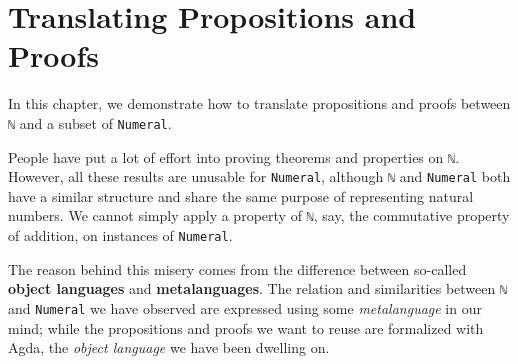 \documentclass[\main/thesis.tex]{subfiles}
\begin{document}
\chapter{Translating Propositions and Proofs}\label{translation}

In this chapter, we demonstrate how to translate propositions and proofs between
\lstinline|ℕ| and a subset of \lstinline|Numeral|.

People have put a lot of effort into proving theorems and properties on
\lstinline|ℕ|.
However, all these results are unusable for \lstinline|Numeral|,
although \lstinline|ℕ| and \lstinline|Numeral| both have a similar structure and
share the same purpose of representing natural numbers.
We cannot simply apply a property of \lstinline|ℕ|, say,
the commutative property of addition, on instances of \lstinline|Numeral|.

The reason behind this misery comes from the difference between so-called
\textbf{object languages} and \textbf{metalanguages}.
The relation and similarities between \lstinline|ℕ| and \lstinline|Numeral|
we have observed are expressed using some \textit{metalanguage} in our mind;
while the propositions and proofs we want to reuse are formalized with Agda,
the \textit{object language} we have been dwelling on.

\begin{center}
    \begin{adjustbox}{max width=\textwidth}
    \end{adjustbox}
\end{center}
\end{document}
